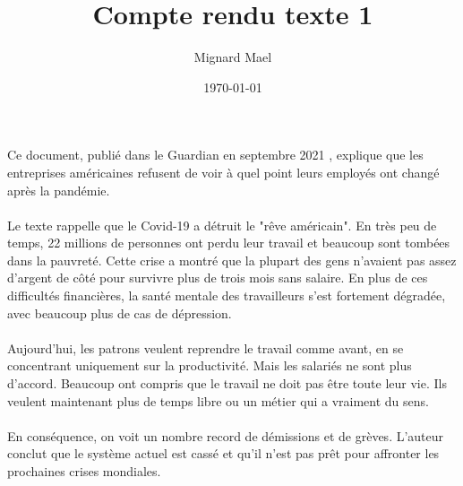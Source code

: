 \documentclass[a4paper,12pt]{article}
\title{Compte rendu texte 1}
\author{Mignard Mael}
\date{\today}
\begin{document}
\maketitle

Ce document, publié dans le Guardian en septembre 2021 , explique que les entreprises américaines refusent de voir à quel point leurs employés ont changé après la pandémie.\\ \\
Le texte rappelle que le Covid-19 a détruit le "rêve américain". 
En très peu de temps, 22 millions de personnes ont perdu leur travail et beaucoup sont tombées dans la pauvreté. 
Cette crise a montré que la plupart des gens n'avaient pas assez d'argent de côté pour survivre plus de trois mois sans salaire. 
En plus de ces difficultés financières, la santé mentale des travailleurs s'est fortement dégradée, avec beaucoup plus de cas de dépression.\\ \\
Aujourd'hui, les patrons veulent reprendre le travail comme avant, en se concentrant uniquement sur la productivité.
Mais les salariés ne sont plus d'accord. 
Beaucoup ont compris que le travail ne doit pas être toute leur vie. 
Ils veulent maintenant plus de temps libre ou un métier qui a vraiment du sens. \\ \\
En conséquence, on voit un nombre record de démissions et de grèves. L'auteur conclut que le système actuel est cassé et qu'il n'est pas prêt pour affronter les prochaines crises mondiales.
\end{document}
